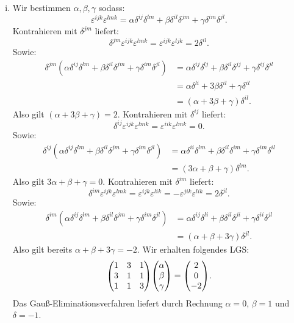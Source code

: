 \documentclass{theozettel}
\renewcommand{\epsilon}{\varepsilon}
\begin{document}
\begin{enumerate}[(a)]
\begin{enumerate}[(i)]
				\item 	Wir bestimmen $\alpha,\beta,\gamma$ sodass:
							\[
								\epsilon^{ijk}\epsilon^{lmk} = \alpha\delta^{ij}\delta^{lm}+\beta\delta^{il}\delta^{jm} +  \gamma\delta^{im}\delta^{jl}.
							\]
						Kontrahieren mit $\delta^{jm}$ liefert:
							\[
								\delta^{jm}\epsilon^{ijk}\epsilon^{lmk} = \epsilon^{ijk}\epsilon^{ljk} = 2 \delta^{il}.
							\]
						Sowie:
							\begin{align*}
								\delta^{jm}(\alpha\delta^{ij}\delta^{lm}+\beta\delta^{il}\delta^{jm} +  \gamma\delta^{im}\delta^{jl}) &= \alpha\delta^{ij}\delta^{lj} + \beta \delta^{il}\delta^{jj} + \gamma\delta^{ij}\delta^{jl} \\
								&= \alpha\delta^{li} + 3\beta\delta^{il} + \gamma\delta^{il} \\
								&= (\alpha + 3\beta + \gamma)\delta^{il}.
							\end{align*}
						Also gilt $(\alpha + 3\beta + \gamma) = 2$. Kontrahieren mit $\delta^{ij}$ liefert:
							\[
								\delta^{ij}\epsilon^{ijk}\epsilon^{lmk} = \epsilon^{iik}\epsilon^{lmk} = 0.
							\]
						Sowie:
							\begin{align*}
								\delta^{ij}(\alpha\delta^{ij}\delta^{lm}+\beta\delta^{il}\delta^{jm} +  \gamma\delta^{im}\delta^{jl}) &= \alpha\delta^{ii}\delta^{lm} + \beta\delta^{il}\delta^{im} + \gamma\delta^{im}\delta^{il} \\
								&= (3\alpha + \beta + \gamma)\delta^{lm}.
							\end{align*}
						Also gilt $3\alpha + \beta  + \gamma = 0$. Kontrahieren mit $\delta^{im}$ liefert:
							\[
								\delta^{im}\epsilon^{ijk}\epsilon^{lmk} = \epsilon^{ijk}\epsilon^{lik} = -\epsilon^{jik}\epsilon^{lik} = 2\delta^{jl}.
							\]	
						Sowie:
							\begin{align*}
								\delta^{im}(\alpha\delta^{ij}\delta^{lm}+\beta\delta^{il}\delta^{jm} +  \gamma\delta^{im}\delta^{jl}) &= \alpha\delta^{ij}\delta^{li} + \beta\delta^{il}\delta^{ji} + \gamma\delta^{ii}\delta^{jl} \\
								&= (\alpha + \beta + 3\gamma)\delta^{jl}.
							\end{align*}
						Also gilt bereits $\alpha +\beta + 3\gamma = -2$. Wir erhalten folgendes LGS:
							\[
								\mqty(1 & 3 & 1 \\ 3 & 1 & 1 \\ 1 & 1& 3) \mqty(\alpha \\ \beta \\ \gamma ) = \mqty(2 \\ 0 \\ -2).
							\]
						Das Gauß-Eliminationsverfahren liefert durch Rechnung $\alpha = 0$, $\beta = 1$ und $\delta = -1$.
			\end{enumerate}
	

\end{enumerate}
\end{document}

